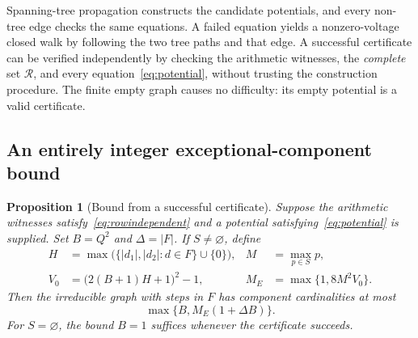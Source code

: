 \documentclass[11pt]{article}
\numberwithin{equation}{section}
\newtheorem{proposition}[theorem]{Proposition}
\theoremstyle{definition}\newtheorem{definition}[theorem]{Definition}
\theoremstyle{remark}\newtheorem{remark}[theorem]{Remark}
\newcommand{\abs}[1]{\lvert #1\rvert}
\begin{document}
Spanning-tree propagation constructs the candidate potentials, and every non-tree edge checks the same equations. A failed equation yields a nonzero-voltage closed walk by following the two tree paths and that edge. A successful certificate can be verified independently by checking the arithmetic witnesses, the \emph{complete} set $\mathcal R$, and every equation~\eqref{eq:potential}, without trusting the construction procedure. The finite empty graph causes no difficulty: its empty potential is a valid certificate.

\subsection{An entirely integer exceptional-component bound}

\begin{proposition}[Bound from a successful certificate]\label{prop:integerbound}
Suppose the arithmetic witnesses satisfy~\eqref{eq:rowindependent} and a potential satisfying~\eqref{eq:potential} is supplied. Set $B=Q^2$ and $\Delta=\abs F$. If $S\ne\varnothing$, define
\begin{align}
 H&=\max\bigl(\{\abs{d_1},\abs{d_2}:d\in F\}\cup\{0\}\bigr),
 &M&=\max_{p\in S}p,\nonumber\\
 V_0&=\bigl(2(B+1)H+1\bigr)^2-1,
 &M_E&=\max\{1,8M^2V_0\}.\label{eq:integerconstants}
\end{align}
Then the irreducible graph with steps in $F$ has component cardinalities at most
\begin{equation}\label{eq:integerbound}
 \max\{B,M_E(1+\Delta B)\}.
\end{equation}
For $S=\varnothing$, the bound $B=1$ suffices whenever the certificate succeeds.
\end{proposition}
\end{document}
